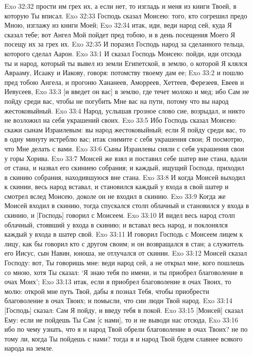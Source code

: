 Exo 32:32  прости им грех их, а если нет, то изгладь и меня из книги Твоей, в которую Ты вписал.
Exo 32:33  Господь сказал Моисею: того, кто согрешил предо Мною, изглажу из книги Моей;
Exo 32:34  итак, иди, веди народ сей, куда Я сказал тебе; вот Ангел Мой пойдет пред тобою, и в день посещения Моего Я посещу их за грех их.
Exo 32:35  И поразил Господь народ за сделанного тельца, которого сделал Аарон.
Exo 33:1  И сказал Господь Моисею: пойди, иди отсюда ты и народ, который ты вывел из земли Египетской, в землю, о которой Я клялся Аврааму, Исааку и Иакову, говоря: потомству твоему дам ее;
Exo 33:2  и пошлю пред тобою Ангела, и прогоню Хананеев, Аморреев, Хеттеев, Ферезеев, Евеев и Иевусеев,
Exo 33:3  [и введет он вас] в землю, где течет молоко и мед; ибо Сам не пойду среди вас, чтобы не погубить Мне вас на пути, потому что вы народ жестоковыйный.
Exo 33:4  Народ, услышав грозное слово сие, возрыдал, и никто не возложил на себя украшений своих.
Exo 33:5  Ибо Господь сказал Моисею: скажи сынам Израилевым: вы народ жестоковыйный; если Я пойду среди вас, то в одну минуту истреблю вас; итак снимите с себя украшения свои; Я посмотрю, что Мне делать с вами.
Exo 33:6  Сыны Израилевы сняли с себя украшения свои у горы Хорива.
Exo 33:7  Моисей же взял и поставил себе шатер вне стана, вдали от стана, и назвал его скиниею собрания; и каждый, ищущий Господа, приходил в скинию собрания, находившуюся вне стана.
Exo 33:8  И когда Моисей выходил к скинии, весь народ вставал, и становился каждый у входа в свой шатер и смотрел вслед Моисею, доколе он не входил в скинию.
Exo 33:9  Когда же Моисей входил в скинию, тогда спускался столп облачный и становился у входа в скинию, и [Господь] говорил с Моисеем.
Exo 33:10  И видел весь народ столп облачный, стоявший у входа в скинию; и вставал весь народ, и поклонялся каждый у входа в шатер свой.
Exo 33:11  И говорил Господь с Моисеем лицем к лицу, как бы говорил кто с другом своим; и он возвращался в стан; а служитель его Иисус, сын Навин, юноша, не отлучался от скинии.
Exo 33:12  Моисей сказал Господу: вот, Ты говоришь мне: веди народ сей, а не открыл мне, кого пошлешь со мною, хотя Ты сказал: `Я знаю тебя по имени, и ты приобрел благоволение в очах Моих';
Exo 33:13  итак, если я приобрел благоволение в очах Твоих, то молю: открой мне путь Твой, дабы я познал Тебя, чтобы приобрести благоволение в очах Твоих; и помысли, что сии люди Твой народ.
Exo 33:14  [Господь] сказал: Сам Я пойду, и введу тебя в покой.
Exo 33:15  [Моисей] сказал Ему: если не пойдешь Ты Сам [с нами], то и не выводи нас отсюда,
Exo 33:16  ибо по чему узнать, что я и народ Твой обрели благоволение в очах Твоих? не по тому ли, когда Ты пойдешь с нами? тогда я и народ Твой будем славнее всякого народа на земле.
